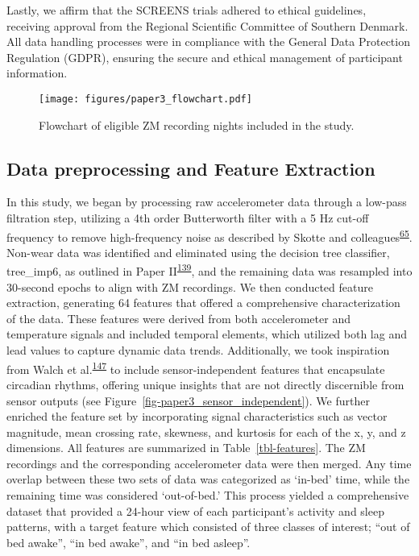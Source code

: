 \documentclass[
  10pt,
]{scrbook}
\begin{document}
Lastly, we affirm that the SCREENS trials adhered to ethical guidelines,
receiving approval from the Regional Scientific Committee of Southern
Denmark. All data handling processes were in compliance with the General
Data Protection Regulation (GDPR), ensuring the secure and ethical
management of participant information.

\begin{figure}

{\centering \texttt{[image: figures/paper3\_flowchart.pdf]}

}

\caption{\label{fig-paper3_flow}Flowchart of eligible ZM recording
nights included in the study.}

\end{figure}

\hypertarget{data-preprocessing-and-feature-extraction}{%
\subsection{Data preprocessing and Feature
Extraction}\label{data-preprocessing-and-feature-extraction}}

In this study, we began by processing raw accelerometer data through a
low-pass filtration step, utilizing a 4th order Butterworth filter with
a 5 Hz cut-off frequency to remove high-frequency noise as described by
Skotte and
colleagues\textsuperscript{\protect\hyperlink{ref-skotte_detection_2014}{65}}.
Non-wear data was identified and eliminated using the decision tree
classifier, tree\_imp6, as outlined in Paper
II\textsuperscript{\protect\hyperlink{ref-skovgaard_generalizability_2023}{139}},
and the remaining data was resampled into 30-second epochs to align with
ZM recordings. We then conducted feature extraction, generating 64
features that offered a comprehensive characterization of the data.
These features were derived from both accelerometer and temperature
signals and included temporal elements, which utilized both lag and lead
values to capture dynamic data trends. Additionally, we took inspiration
from Walch et
al.\textsuperscript{\protect\hyperlink{ref-walch_sleep_2019}{147}} to
include sensor-independent features that encapsulate circadian rhythms,
offering unique insights that are not directly discernible from sensor
outputs (see Figure~\ref{fig-paper3_sensor_independent}). We further
enriched the feature set by incorporating signal characteristics such as
vector magnitude, mean crossing rate, skewness, and kurtosis for each of
the x, y, and z dimensions. All features are summarized in
Table~\ref{tbl-features}. The ZM recordings and the corresponding
accelerometer data were then merged. Any time overlap between these two
sets of data was categorized as `in-bed' time, while the remaining time
was considered `out-of-bed.' This process yielded a comprehensive
dataset that provided a 24-hour view of each participant's activity and
sleep patterns, with a target feature which consisted of three classes
of interest; ``out of bed awake'', ``in bed awake'', and ``in bed
asleep''.
\end{document}
